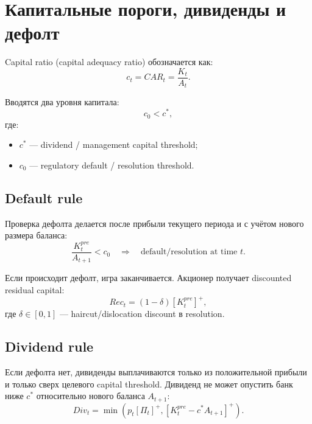 \documentclass[11pt,a4paper]{article}
\newcommand{\1}{\mathbf{1}}
\newcommand{\pos}[1]{\left[#1\right]^+}
\begin{document}
\section{Капитальные пороги, дивиденды и дефолт}

Capital ratio (capital adequacy ratio) обозначается как:
\begin{equation}
    c_t = CAR_t = \frac{K_t}{A_t}.
\end{equation}

Вводятся два уровня капитала:
\begin{equation}
    c_0 < c^*,
\end{equation}
где:
\begin{itemize}[noitemsep]
    \item $c^*$ --- dividend / management capital threshold;
    \item $c_0$ --- regulatory default / resolution threshold.
\end{itemize}

\subsection{Default rule}

Проверка дефолта делается после прибыли текущего периода и с учётом нового размера баланса:
\begin{equation}
    \frac{K_t^{pre}}{A_{t+1}} < c_0
    \quad\Rightarrow\quad
    \text{default/resolution at time } t.
\end{equation}

Если происходит дефолт, игра заканчивается. Акционер получает discounted residual capital:
\begin{equation}
    Rec_t = (1-\delta)\pos{K_t^{pre}},
\end{equation}
где $\delta\in[0,1]$ --- haircut/dislocation discount в resolution.

\subsection{Dividend rule}

Если дефолта нет, дивиденды выплачиваются только из положительной прибыли и только сверх целевого capital threshold. Дивиденд не может опустить банк ниже $c^*$ относительно нового баланса $A_{t+1}$:
\begin{equation}
    Div_t
    =
    \min\left(
        p_t\pos{\Pi_t},
        \pos{K_t^{pre}-c^*A_{t+1}}
    \right).
\end{equation}
\end{document}
